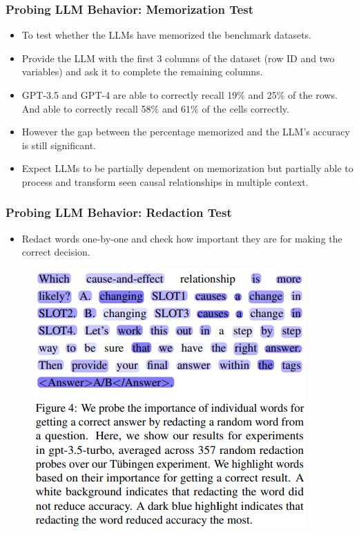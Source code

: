 \documentclass{beamer}
\begin{document}
\begin{frame}
	\frametitle{Probing LLM Behavior: Memorization Test}
	\begin{itemize}
		\item To test whether the LLMs have memorized the benchmark datasets.
		\item Provide the LLM with the first 3 columns of the dataset (row ID and two variables) and 
			ask it to complete the remaining columns.
		\item GPT-3.5 and GPT-4 are able to correctly recall 19\% and 25\% of the rows. And able to correctly
			recall 58\% and 61\% of the cells correctly.
		\item However the gap between the percentage memorized and the LLM's accuracy is still significant.
		\item Expect LLMs to be partially dependent on memorization but partially able to process and transform
			seen causal relationships in multiple context.
	\end{itemize}
\end{frame}

\begin{frame}
	\frametitle{Probing LLM Behavior: Redaction Test}
	\begin{itemize}
		\item Redact words one-by-one and check how important they are for making the correct decision.
	\end{itemize}
	\begin{figure}
		\centering
		\includegraphics[scale=0.4]{imgs/figure4.png}
	\end{figure}
\end{frame}
\end{document}
